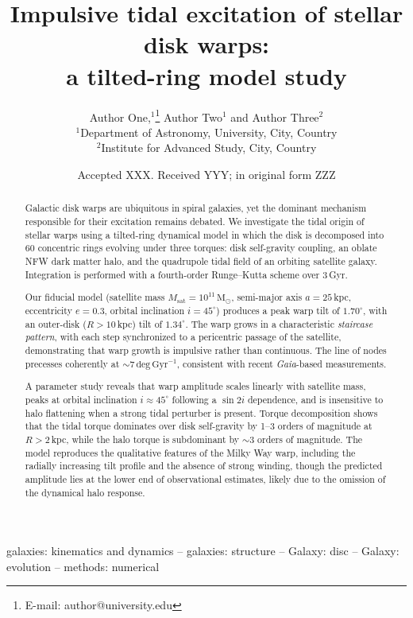 \documentclass[fleqn,usenatbib]{mnras}
\title[Tidal-Induced Stellar Warps]{Impulsive tidal excitation of stellar disk warps: \\
a tilted-ring model study}
\author[Author et al.]{
Author One,$^{1}$\thanks{E-mail: author@university.edu}
Author Two$^{1}$
and Author Three$^{2}$
\\
$^{1}$Department of Astronomy, University, City, Country\\
$^{2}$Institute for Advanced Study, City, Country
}
\date{Accepted XXX. Received YYY; in original form ZZZ}
\begin{document}
\label{firstpage}
\pagerange{\pageref{firstpage}--\pageref{lastpage}}
\maketitle

\begin{abstract}
Galactic disk warps are ubiquitous in spiral galaxies, yet the dominant mechanism responsible for their excitation remains debated. We investigate the tidal origin of stellar warps using a tilted-ring dynamical model in which the disk is decomposed into 60 concentric rings evolving under three torques: disk self-gravity coupling, an oblate NFW dark matter halo, and the quadrupole tidal field of an orbiting satellite galaxy. Integration is performed with a fourth-order Runge--Kutta scheme over 3\,Gyr.

Our fiducial model (satellite mass $M_\mathrm{sat}=10^{11}\,\mathrm{M}_\odot$, semi-major axis $a=25$\,kpc, eccentricity $e=0.3$, orbital inclination $i=45^\circ$) produces a peak warp tilt of $1.70^\circ$, with an outer-disk ($R>10$\,kpc) tilt of $1.34^\circ$. The warp grows in a characteristic \emph{staircase pattern}, with each step synchronized to a pericentric passage of the satellite, demonstrating that warp growth is impulsive rather than continuous. The line of nodes precesses coherently at ${\sim}7\,\mathrm{deg\,Gyr}^{-1}$, consistent with recent \textit{Gaia}-based measurements.

A parameter study reveals that warp amplitude scales linearly with satellite mass, peaks at orbital inclination $i\approx45^\circ$ following a $\sin 2i$ dependence, and is insensitive to halo flattening when a strong tidal perturber is present. Torque decomposition shows that the tidal torque dominates over disk self-gravity by 1--3 orders of magnitude at $R>2$\,kpc, while the halo torque is subdominant by ${\sim}3$ orders of magnitude. The model reproduces the qualitative features of the Milky Way warp, including the radially increasing tilt profile and the absence of strong winding, though the predicted amplitude lies at the lower end of observational estimates, likely due to the omission of the dynamical halo response.
\end{abstract}

\begin{keywords}
galaxies: kinematics and dynamics -- galaxies: structure -- Galaxy: disc -- Galaxy: evolution -- methods: numerical
\end{keywords}
\end{document}

